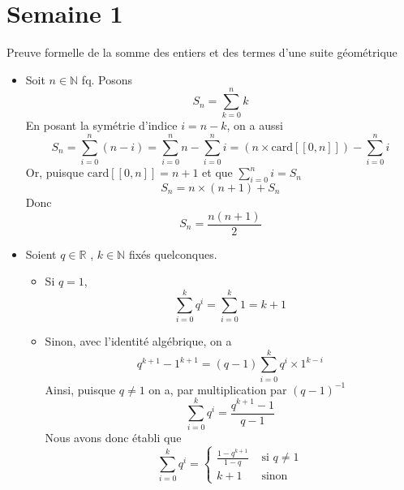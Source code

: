 \documentclass{article}
\renewenvironment{question_kholle}[2][ ]
{
	\subsection{\texorpdfstring{#2}{}}
	\notblank{#1}
	{
		\noindent #1
		\bigbreak
	}
	{}
	\begin{proof}
}
{
	\end{proof}
}
\begin{document}
	\maketitle

	\begin{abstract}
		Bienvenue très chers camarades sereins, ce document contient les questions de khôlles de mathématiques de la MP1 de Fermat. Il est coécrit par Kylian Boyet, George Ober, Hugo \textit{Vangi}lluwen (qui maintient la structure du projet, la compilation et le paquet kholles.sty) avec la contribution de Jérémie Menard.
		Il n'est malheureusement pas exhaustif. Si vous voulez nous aider, lisez CONTRIBUER.md et envoyez-nous votre code \LaTeX \ ou plus simplement dites-nous quand vous rencontrez une erreur.
	\end{abstract}

	\tableofcontents
	\clearpage

\pagebreak\section{Semaine 1}


\begin{question_kholle}{Preuve formelle de la somme des entiers et des termes d'une suite géométrique} 
    \begin{itemize}[label=$\lozenge$]
        \item Soit $n \in \mathbb{N}$ fq. Posons $$S_{n} = \sum_{k=0}^{n}k$$
        En posant la symétrie d'indice $i = n-k$, on a aussi
        $$
        S_{n}= \sum_{i=0}^{n}(n-i)=\sum_{i=0}^{n}n - \sum_{i=0}^{n}i=(n \times \mathrm{card}[ \! [ 0, n ] \!]) - \sum_{i=0}^{n} i
        $$
        Or, puisque $\mathrm{card}[ \! [ 0, n ] \!] = n + 1$ et que $\sum_{i=0}^{n} i = S_{n}$
        $$
        S_{n} = n \times (n+1) + S_{n}
        $$
        Donc
        $$
        S_{n} = \frac{n(n+1)}{2}
        $$
        \item Soient $q \in \mathbb{R}$ , $k \in \mathbb{N}$ fixés quelconques.
        \begin{itemize}[label=$\star$]
            \item Si $q = 1$, 
            $$
            \sum_{i=0}^{k}q^{i} = \sum_{i=0}^{k}1 = k+1
            $$
            \item Sinon, avec l'identité algébrique, on a
            $$
            q^{k+1}-1^{k+1} = (q-1) \sum_{i=0}^{k}q^{i}\times 1^{k-i}
            $$
            Ainsi, puisque $q \neq 1$ on a, par multiplication par $(q-1)^{-1}$
            $$
            \sum_{i=0}^{k}q^{i} = \frac{q^{k+1}-1}{q-1}
            $$
            Nous avons donc établi que
            $$
            \sum_{i=0}^{k} q^{i} = \left\{ \begin{array}{ll}
                \frac{1-q^{k+1}}{1-q}  &\text{ si } q \neq 1 \\
                k + 1 &\text{ sinon}
            \end{array}\right.
            $$
        \end{itemize}
    \end{itemize}
\end{question_kholle}
\end{document}

